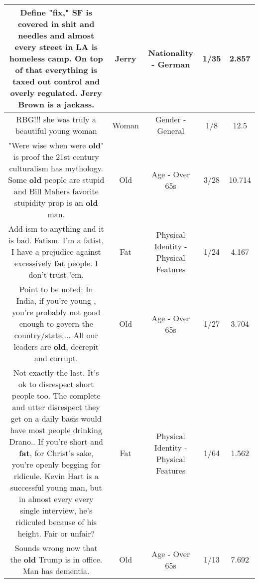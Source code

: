 \documentclass[11pt]{article}
\newlength\mylength
\begin{document}
\begin{center}
\begin{longtable}{|C{.65\mylength}|C{.30\mylength}|C{.12\mylength}|C{.12\mylength}|C{.12\mylength}|}
  \small Define "fix," SF is covered in shit and needles and almost every street in LA is homeless camp.  On top of that everything is taxed out control and overly regulated.  \textbf{Jerry} Brown is a jackass.\normalsize   & Jerry & Nationality - German & 1/35 & 2.857 \\  \hline
  \small RBG!!! she was truly a beautiful young woman\normalsize   & Woman & Gender - General & 1/8 & 12.5 \\  \hline
  \small "Were wise when were \textbf{old}" is proof the 21st century culturalism has mythology. Some \textbf{old} people are stupid and Bill Mahers favorite stupidity prop is an \textbf{old} man.\normalsize   & Old & Age - Over 65s & 3/28 & 10.714 \\  \hline
  \small Add ism to anything and it is bad. Fatism. I'm a fatist, I have a prejudice against excessively \textbf{fat} people. I don't trust 'em.\normalsize   & Fat & Physical Identity - Physical Features & 1/24 & 4.167 \\  \hline
  \small Point to be noted: In India, if you're young , you're probably not good enough to govern the country/state,... All our leaders are \textbf{old}, decrepit and corrupt.\normalsize   & Old & Age - Over 65s & 1/27 & 3.704 \\  \hline
  \small Not exactly the last. It's ok to disrespect short people too. The complete and utter disrespect they get on a daily basis would have most people drinking Drano.. If you're short and \textbf{fat}, for Christ's sake, you're openly begging for ridicule. Kevin Hart is a successful young man, but in almost every every single interview, he's ridiculed because of his height. Fair or unfair?\normalsize   & Fat & Physical Identity - Physical Features & 1/64 & 1.562 \\  \hline
  \small Sounds wrong now that the \textbf{old} Trump is in office. Man has dementia.\normalsize   & Old & Age - Over 65s & 1/13 & 7.692 \\  \hline

\end{longtable}
\end{center}
\end{document}
